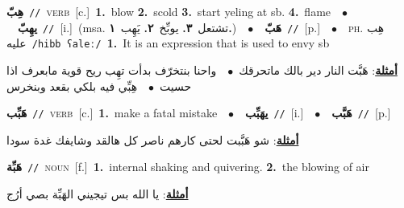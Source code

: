 \documentclass[10pt,a4paper,twoside]{article} %
\begin{document}
\begin{multicols}{2}
{{\setlength\topsep{0pt}\textbf{\foreignlanguage{arabic}{هِبّ}}\ {\color{gray}\texttt{//}\color{black}}\ \textsc{verb}\ [c.]\ \textbf{1.}~blow  \textbf{2.}~scold  \textbf{3.}~start yeling at sb.  \textbf{4.}~flame\ \ $\bullet$\ \ \setlength\topsep{0pt}\textbf{\foreignlanguage{arabic}{يهِبّ}}\ {\color{gray}\texttt{//}\color{black}}\ [i.]\ \color{gray}(msa. \foreignlanguage{arabic}{تشتعل}~\foreignlanguage{arabic}{\textbf{٣.}}  \foreignlanguage{arabic}{يوبِّخ}~\foreignlanguage{arabic}{\textbf{٢.}}  \foreignlanguage{arabic}{يَهِب}~\foreignlanguage{arabic}{\textbf{١.}})\color{black}\ \ $\bullet$\ \ \setlength\topsep{0pt}\textbf{\foreignlanguage{arabic}{هَبّ}}\ {\color{gray}\texttt{//}\color{black}}\ [p.]\ \ $\bullet$\ \ \textsc{ph.} \color{gray} \foreignlanguage{arabic}{هِب عليه}\color{black}\ {\color{gray}\texttt{/{\sffamily hibb ʕaleː}/}\color{black}}\ \textbf{1.}~It is an expression that is used to envy sb\  \begin{flushright}\color{gray}\foreignlanguage{arabic}{\textbf{\underline{\foreignlanguage{arabic}{أمثلة}}}: هَبَّت النار دير بالك ماتحرقك\ $\bullet$\ \  واحنا بنتخرّف بدأت تهِب ريح قوية مابعرف اذا حسيت\ $\bullet$\ \  هِبِّي فيه بلكي بقعد وبنخرس}\end{flushright}\color{black}} \vspace{2mm}

{\setlength\topsep{0pt}\textbf{\foreignlanguage{arabic}{هَبِّب}}\ {\color{gray}\texttt{//}\color{black}}\ \textsc{verb}\ [c.]\ \textbf{1.}~make a fatal mistake\ \ $\bullet$\ \ \setlength\topsep{0pt}\textbf{\foreignlanguage{arabic}{يهَبِّب}}\ {\color{gray}\texttt{//}\color{black}}\ [i.]\ \ $\bullet$\ \ \setlength\topsep{0pt}\textbf{\foreignlanguage{arabic}{هَبَّب}}\ {\color{gray}\texttt{//}\color{black}}\ [p.]\  \begin{flushright}\color{gray}\foreignlanguage{arabic}{\textbf{\underline{\foreignlanguage{arabic}{أمثلة}}}: شو هَبَّبت لحتى كارهم ناصر كل هالقد وشايفك غدة سودا}\end{flushright}\color{black}} \vspace{2mm}

{\setlength\topsep{0pt}\textbf{\foreignlanguage{arabic}{هَبِّة}}\ {\color{gray}\texttt{//}\color{black}}\ \textsc{noun}\ [f.]\ \textbf{1.}~internal shaking and quivering.  \textbf{2.}~the blowing of air\  \begin{flushright}\color{gray}\foreignlanguage{arabic}{\textbf{\underline{\foreignlanguage{arabic}{أمثلة}}}: يا الله بس تيجيني الهَبِّة بصي أرُج}\end{flushright}\color{black}} \vspace{2mm}

}
\end{multicols}
\end{document}
